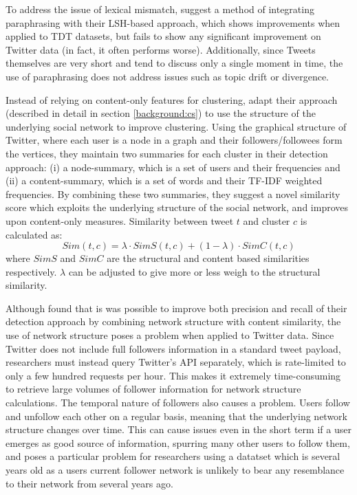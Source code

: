 To address the issue of lexical mismatch, \cite{Petrovic:2012:UPI:2382029.2382072} suggest a method of integrating paraphrasing with their LSH-based approach, which shows improvements when applied to TDT datasets, but fails to show any significant improvement on Twitter data (in fact, it often performs worse).
Additionally, since Tweets themselves are very short and tend to discuss only a single moment in time, the use of paraphrasing does not address issues such as topic drift or divergence.

Instead of relying on content-only features for clustering, \cite{Aggarwal12} adapt their approach (described in detail in section \ref{background:cs}) to use the structure of the underlying social network to improve clustering.
Using the graphical structure of Twitter, where each user is a node in a graph and their followers/followees form the vertices, they maintain two summaries
for each cluster in their detection approach: (i) a node-summary, which is a set of users and their frequencies and (ii) a content-summary, which is a set of words and their TF-IDF \citep{Salton:1988:TAA:54259.54260} weighted frequencies.
By combining these two summaries, they suggest a novel similarity score which exploits the underlying structure of the social network, and improves upon content-only measures.
Similarity between tweet $t$ and cluster $c$ is calculated as:
\begin{equation}
	Sim(t, c) = \lambda \cdot SimS(t, c) + (1 - \lambda) \cdot SimC(t, c)
\end{equation}
where $SimS$ and $SimC$ are the structural and content based similarities respectively.
$\lambda$ can be adjusted to give more or less weigh to the structural similarity.

Although \cite{Aggarwal12} found that is was possible to improve both precision and recall of their detection approach by combining network structure with content similarity, the use of network structure poses a problem when applied to Twitter data.
Since Twitter does not include full followers information in a standard tweet payload, researchers must instead query Twitter's API separately, which is rate-limited to only a few hundred requests per hour.
This makes it extremely time-consuming to retrieve large volumes of follower information for network structure calculations.
The temporal nature of followers also causes a problem.
Users follow and unfollow each other on a regular basis, meaning that the underlying network structure changes over time.
This can cause issues even in the short term if a user emerges as good source of information, spurring many other users to follow them, and poses a particular problem for researchers using a datatset which is several years old as a users current follower network is unlikely to bear any resemblance to their network from several years ago.

